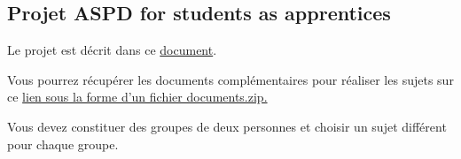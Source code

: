 \documentclass[ 12pt]{article}
\begin{document}
  \subsection{Projet ASPD for students as apprentices}
\label{sec:project}

Le  projet est décrit   dans ce
\href{http://mery54.github.io/teaching/aspd/lecturesnotes/projetaspd2025.pdf}{document}.

Vous pourrez  récupérer les  documents  complémentaires  pour réaliser
les sujets sur ce \href{http://mery54.github.io/teaching/aspd/lecturesnotes/documents.zip}{ lien  sous la forme  d'un fichier documents.zip.}



Vous devez  constituer des groupes de deux personnes   et choisir un
sujet  différent pour chaque groupe.





\end{document}
